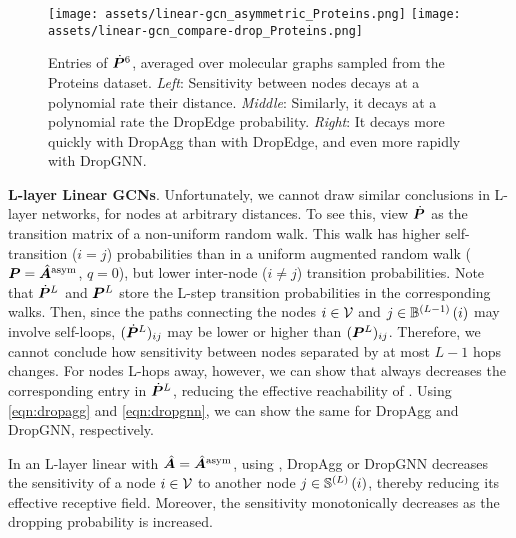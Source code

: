 \begin{figure}
    \centering
    \texttt{[image: assets/linear-gcn\_asymmetric\_Proteins.png]}
    \texttt{[image: assets/linear-gcn\_compare-drop\_Proteins.png]}
    \caption{Entries of $\dot{\bm{P}}^6$, averaged over molecular graphs sampled from the Proteins dataset. \textit{Left}: Sensitivity between nodes decays at a polynomial rate \wrt their distance. \textit{Middle}: Similarly, it decays at a polynomial rate \wrt the DropEdge probability. \textit{Right}: It decays more quickly with DropAgg than with DropEdge, and even more rapidly with DropGNN.}
    \label{fig:linear-gcn_asymmetric}
\end{figure}

\textbf{L-layer Linear GCNs}. Unfortunately, we cannot draw similar conclusions in L-layer networks, for nodes at arbitrary distances. To see this, view $\dot{\bm{P}}$ as the transition matrix of a non-uniform random walk. %
This walk has higher self-transition ($i = j$) probabilities than in a uniform augmented random walk ($\bm{P} = \hat{\bm{A}}^{\text{asym}}$, $q=0$), but lower inter-node ($i \neq j$) transition probabilities. Note that $\dot{\bm{P}}^L$ and $\bm{P}^L$ store the L-step transition probabilities in the corresponding walks. Then, since the paths connecting the nodes $i\in\mathcal{V}$ and $j\in\mathbb{B}^{\left(L-1\right)}\left(i\right)$ may involve self-loops, $(\dot{\bm{P}}^L)_{ij}$ may be lower or higher than $(\bm{P}^L)_{ij}$. Therefore, we cannot conclude how sensitivity between nodes separated by at most $L-1$ hops changes. For nodes L-hops away, however, we can show that  always decreases the corresponding entry in $\dot{\bm{P}}^L$, reducing the effective reachability of . Using \autoref{eqn:dropagg} and \autoref{eqn:dropgnn}, we can show the same for DropAgg and DropGNN, respectively.

\begin{theorem}
\label{thm:sensitivity-l-layer-dec}
    In an L-layer linear  with $\hat{\bm{A}} = \hat{\bm{A}}^{\text{asym}}$, using , DropAgg or DropGNN decreases the sensitivity of a node $i\in\mathcal{V}$ to another node $j\in \mathbb{S}^{\left(L\right)}\left(i\right)$, thereby reducing its effective receptive field. Moreover, the sensitivity monotonically decreases as the dropping probability is increased.
\end{theorem}

